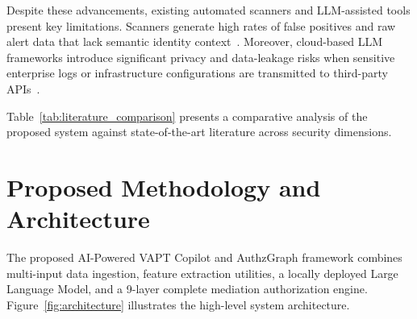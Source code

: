 \documentclass[journal]{IEEEtran}
\begin{document}
Despite these advancements, existing automated scanners and LLM-assisted tools present key limitations. Scanners generate high rates of false positives and raw alert data that lack semantic identity context~\cite{patel2022automated,johnson2021automated}. Moreover, cloud-based LLM frameworks introduce significant privacy and data-leakage risks when sensitive enterprise logs or infrastructure configurations are transmitted to third-party APIs~\cite{ferrag2024generative}.

Table~\ref{tab:literature_comparison} presents a comparative analysis of the proposed system against state-of-the-art literature across security dimensions.

\begin{table}[!t]
\centering
\caption{Comparative Analysis of API Vulnerability Assessment Systems}
\label{tab:literature_comparison}
\end{table}


\section{Proposed Methodology and Architecture}

The proposed AI-Powered VAPT Copilot and AuthzGraph framework combines multi-input data ingestion, feature extraction utilities, a locally deployed Large Language Model, and a 9-layer complete mediation authorization engine. Figure~\ref{fig:architecture} illustrates the high-level system architecture.
\end{document}
